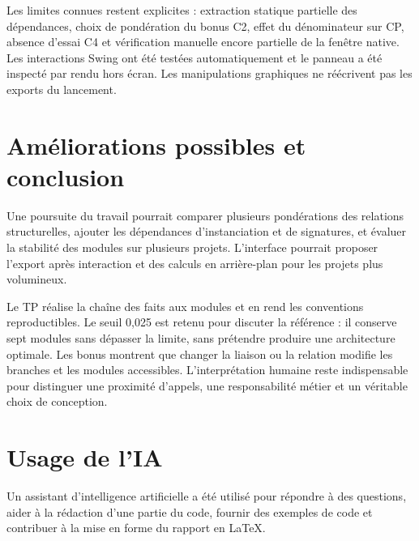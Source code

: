 \documentclass[11pt,a4paper]{article}
\begin{document}
Les limites connues restent explicites : extraction statique partielle des
dépendances, choix de pondération du bonus C2, effet du dénominateur sur CP,
absence d'essai C4 et vérification manuelle encore partielle de la fenêtre native.
Les interactions Swing ont été testées automatiquement et le panneau a été
inspecté par rendu hors écran. Les manipulations graphiques ne réécrivent
pas les exports du lancement.

\section{Améliorations possibles et conclusion}
Une poursuite du travail pourrait comparer plusieurs pondérations des
relations structurelles, ajouter les dépendances d'instanciation et de
signatures, et évaluer la stabilité des modules sur plusieurs projets.
L'interface pourrait proposer l'export après interaction et des calculs en
arrière-plan pour les projets plus volumineux.

Le TP réalise la chaîne des faits aux modules et en rend les conventions
reproductibles. Le seuil 0,025 est retenu pour discuter la référence : il
conserve sept modules sans dépasser la limite, sans prétendre produire une
architecture optimale. Les bonus montrent que changer la liaison ou la
relation modifie les branches et les modules accessibles. L'interprétation
humaine reste indispensable pour distinguer une proximité d'appels, une
responsabilité métier et un véritable choix de conception.

\section{Usage de l'IA}
Un assistant d'intelligence artificielle a été utilisé pour répondre à des
questions, aider à la rédaction d'une partie du code, fournir des exemples
de code et contribuer à la mise en forme du rapport en \LaTeX.
\end{document}
